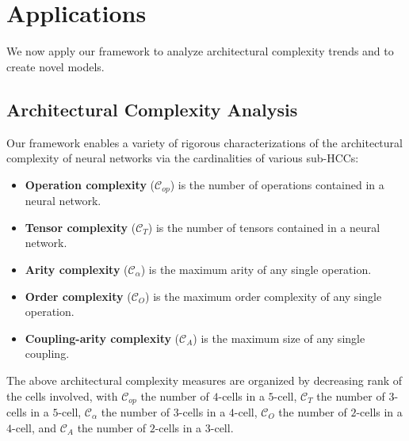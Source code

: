 \documentclass{article}
\theoremstyle{plain}
\theoremstyle{definition}
\theoremstyle{remark}
\newcommand{\cC}{\mathcal{C}}
\begin{document}
\section{Applications}
We now apply our framework to analyze architectural complexity trends and to create novel models.
\subsection{\label{sec:ComplexityAnalysis}Architectural Complexity Analysis}
Our framework enables a variety of rigorous characterizations of the architectural complexity of neural networks via the cardinalities of various sub-HCCs:
\begin{itemize}[leftmargin=*, itemindent=0pt]
	\itemsep0em 
	\item \textbf{Operation complexity} ($\cC_{op}$) is the number of operations contained in a neural network.
	\item \textbf{Tensor complexity} ($\cC_{T}$) is the number of tensors contained in a neural network.
	\item \textbf{Arity complexity} ($\cC_{\alpha}$) is the maximum arity of any single operation.
	\item \textbf{Order complexity} ($\cC_{O}$) is the maximum order complexity of any single operation.
	\item \textbf{Coupling-arity complexity} ($\cC_{A}$) is the maximum size of any single coupling.
\end{itemize}
The above architectural complexity measures are organized by decreasing rank of the cells involved, with $\cC_{op}$ the number of $4$-cells in a $5$-cell, $\cC_T$ the number of $3$-cells in a $5$-cell, $\cC_{\alpha}$ the number of $3$-cells in a $4$-cell, $\cC_O$ the number of $2$-cells in a $4$-cell, and $\cC_A$ the number of $2$-cells in a $3$-cell. 
\end{document}

